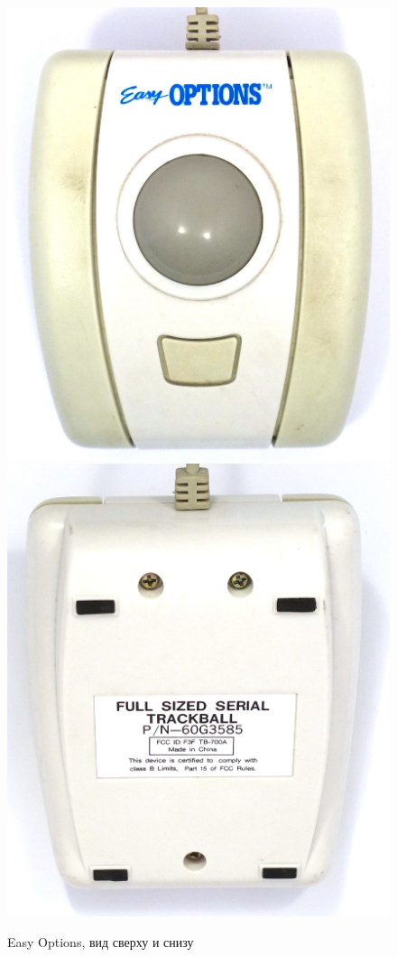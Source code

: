 \documentclass[11pt, a4paper]{article}
\begin{document}
\begin{figure}[h]
    \centering
    \includegraphics[scale=0.6]{1993_easy_options_trackball/top_60.jpg}
    \includegraphics[scale=0.6]{1993_easy_options_trackball/bottom_60.jpg}
    \caption{Easy Options, вид сверху и снизу}
    \label{fig:EasyOptionsTopBottom}
\end{figure}
\end{document}
